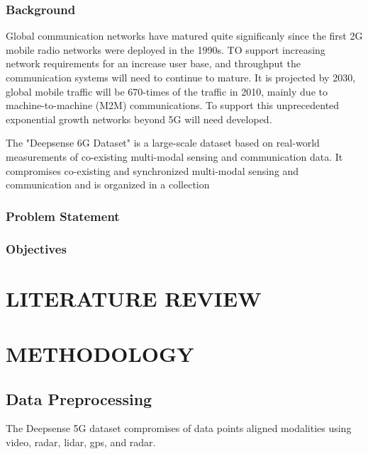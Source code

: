 \documentclass{UCF_ETD}
\begin{document}
\subsection{Background}

Global communication networks have matured quite significanly since the first 2G mobile radio networks were deployed in the 1990s. TO support increasing network requirements for an increase user base, and throughput the communication systems will need to continue to mature. It is projected by 2030, global mobile traffic will be 670-times of the traffic in 2010, mainly due to machine-to-machine (M2M) communications. \cite{salameh20225g}\cite{ITU2370} To support this unprecedented exponential growth networks beyond 5G will need developed.


The "Deepsense 6G Dataset" is a large-scale dataset based on real-world measurements of co-existing multi-modal sensing and communication data. It compromises co-existing and synchronized multi-modal sensing and communication and is organized in a collection 
\cite{alkhateeb2023deepsense}


\subsection{Problem Statement}

\subsection{Objectives}


\chapter{LITERATURE REVIEW}




\chapter{METHODOLOGY}
\section{Data Preprocessing}
The Deepsense 5G dataset compromises of data points aligned modalities using video, radar, lidar, gps, and radar.
\end{document}
